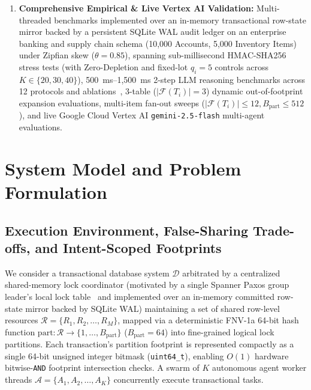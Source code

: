 \documentclass[conference,10pt]{IEEEtran}
\begin{document}
\begin{enumerate}
    \item \textbf{Comprehensive Empirical \& Live Vertex AI Validation:} Multi-threaded benchmarks implemented over an in-memory transactional row-state mirror backed by a persistent SQLite WAL audit ledger on an enterprise banking and supply chain schema (10,000 Accounts, 5,000 Inventory Items) under Zipfian skew ($\theta = 0.85$), spanning sub-millisecond HMAC-SHA256 stress tests (with Zero-Depletion and fixed-lot $q_i=5$ controls across $K \in \{20, 30, 40\}$), 500~ms--1,500~ms 2-step LLM reasoning benchmarks across 12 protocols and ablations~\cite{eswaran1976notions, abbott1992scheduling, rosenkrantz1978system, kung1981optimistic, bernstein1987concurrency, harding2017evaluation}, 3-table ($|\mathcal{F}(T_i)| = 3$) dynamic out-of-footprint expansion evaluations, multi-item fan-out sweeps ($|\mathcal{F}(T_i)| \le 12, B_{\text{part}} \le 512$), and live Google Cloud Vertex AI \texttt{gemini-2.5-flash} multi-agent evaluations.
\end{enumerate}

\section{System Model and Problem Formulation}

\subsection{Execution Environment, False-Sharing Trade-offs, and Intent-Scoped Footprints}
We consider a transactional database system $\mathcal{D}$ arbitrated by a centralized shared-memory lock coordinator (motivated by a single Spanner Paxos group leader's local lock table~\cite{corbett2013spanner} and implemented over an in-memory committed row-state mirror backed by SQLite WAL) maintaining a set of shared row-level resources $\mathcal{R} = \{R_1, R_2, \dots, R_M\}$, mapped via a deterministic FNV-1a 64-bit hash function $\text{part} : \mathcal{R} \to \{1, \dots, B_{\text{part}}\}$ ($B_{\text{part}} = 64$) into fine-grained logical lock partitions. Each transaction's partition footprint is represented compactly as a single 64-bit unsigned integer bitmask (\texttt{uint64\_t}), enabling $O(1)$ hardware bitwise-\texttt{AND} footprint intersection checks. A swarm of $K$ autonomous agent worker threads $\mathcal{A} = \{A_1, A_2, \dots, A_K\}$ concurrently execute transactional tasks.
\end{document}
